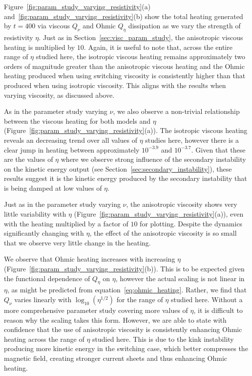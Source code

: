 Figure~\ref{fig:param_study_varying_resistivity}(a) and~\ref{fig:param_study_varying_resistivity}(b) show the total heating generated by $t=400$ via viscous $Q_{\nu}$ and Ohmic $Q_{\eta}$ dissipation as we vary the strength of resistivity $\eta$. Just as in Section~\ref{sec:visc_param_study}, the anisotropic viscous heating is multiplied by $10$. Again, it is useful to note that, across the entire range of $\eta$ studied here, the isotropic viscous heating remains approximately two orders of magnitude greater than the anisotropic viscous heating and the Ohmic heating produced when using switching viscosity is consistently higher than that produced when using isotropic viscosity. This aligns with the results when varying viscosity, as discussed above.

As in the parameter study varying $\nu$, we also observe a non-trivial relationship between the viscous heating for both models and $\eta$ (Figure~\ref{fig:param_study_varying_resistivity}(a)). The isotropic viscous heating reveals an decreasing trend over all values of $\eta$ studies here, however there is a clear jump in heating between approximately $10^{-3.9}$ and $10^{-3.7}$. Given that these are the values of $\eta$ where we observe strong influence of the secondary instability on the kinetic energy output (see Section~\ref{sec:secondary_instability}), these results suggest it is the kinetic energy produced by the secondary instability that is being damped at low values of $\eta$.

Just as in the parameter study varying $\nu$, the anisotropic viscosity shows very little variability with $\eta$ (Figure~\ref{fig:param_study_varying_resistivity}(a)), even with the heating multiplied by a factor of $10$ for plotting. Despite the dynamics significantly changing with $\eta$, the effect of the anisotropic viscosity is so small that we observe very little change in the heating.

We observe that Ohmic heating increases with increasing $\eta$ (Figure~\ref{fig:param_study_varying_resistivity}(b)). This is to be expected given the functional dependence of $Q_{\eta}$ on $\eta$, however the actual scaling is not linear in $\eta$, as might be predicted from equation~\eqref{eq:ohmic_heating}. Rather, we find that $Q_{\nu}$ varies linearly with $\log_{10}(\eta^{1/2})$ for the range of $\eta$ studied here. Without a more comprehensive parameter study covering more values of $\eta$, it is difficult to reason why the scaling takes this form. However, we are able to state with confidence that the use of anisotropic viscosity is consistently enhancing Ohmic heating across the range of $\eta$ studied here. This is due to the kink instability producing more kinetic energy in the switching case, which better compresses the magnetic field, creating stronger current sheets and thus enhancing Ohmic heating.

